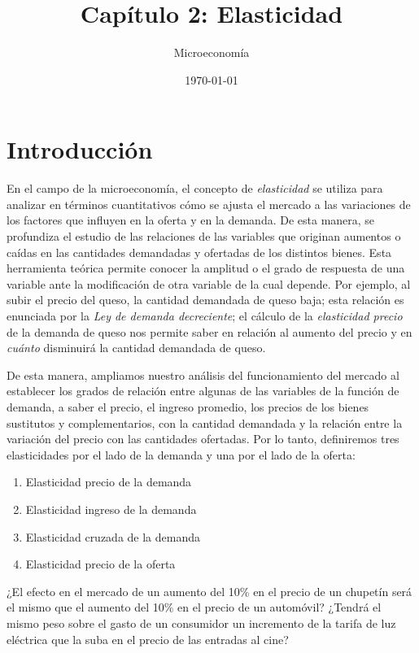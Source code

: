 \documentclass[12pt,a4paper]{article}
\title{Capítulo 2: Elasticidad}
\author{Microeconomía}
\date{\today}
\begin{document}
\maketitle
\tableofcontents
\newpage

\section{Introducción}

En el campo de la microeconomía, el concepto de \textit{elasticidad} se utiliza para analizar en términos cuantitativos cómo se ajusta el mercado a las variaciones de los factores que influyen en la oferta y en la demanda. De esta manera, se profundiza el estudio de las relaciones de las variables que originan aumentos o caídas en las cantidades demandadas y ofertadas de los distintos bienes. Esta herramienta teórica permite conocer la amplitud o el grado de respuesta de una variable ante la modificación de otra variable de la cual depende. Por ejemplo, al subir el precio del queso, la cantidad demandada de queso baja; esta relación es enunciada por la \textit{Ley de demanda decreciente}; el cálculo de la \textit{elasticidad precio} de la demanda de queso nos permite saber en relación al aumento del precio y en \textit{cuánto} disminuirá la cantidad demandada de queso.

De esta manera, ampliamos nuestro análisis del funcionamiento del mercado al establecer los grados de relación entre algunas de las variables de la función de demanda, a saber el precio, el ingreso promedio, los precios de los bienes sustitutos y complementarios, con la cantidad demandada y la relación entre la variación del precio con las cantidades ofertadas. Por lo tanto, definiremos tres elasticidades por el lado de la demanda y una por el lado de la oferta:

\begin{enumerate}
    \item Elasticidad precio de la demanda
    \item Elasticidad ingreso de la demanda
    \item Elasticidad cruzada de la demanda
    \item Elasticidad precio de la oferta
\end{enumerate}

¿El efecto en el mercado de un aumento del 10\% en el precio de un chupetín será el mismo que el aumento del 10\% en el precio de un automóvil? ¿Tendrá el mismo peso sobre el gasto de un consumidor un incremento de la tarifa de luz eléctrica que la suba en el precio de las entradas al cine?
\end{document}
